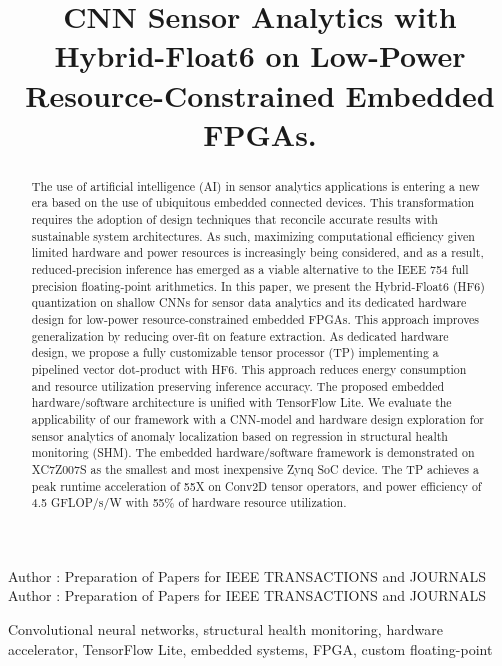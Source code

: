 \title {CNN Sensor Analytics with Hybrid-Float6 on Low-Power Resource-Constrained Embedded FPGAs.}



\markboth
{Author \headeretal: Preparation of Papers for IEEE TRANSACTIONS and JOURNALS}
{Author \headeretal: Preparation of Papers for IEEE TRANSACTIONS and JOURNALS}


\begin{abstract}
The use of artificial intelligence (AI) in sensor analytics applications is entering a new era based on the use of ubiquitous embedded connected devices. This transformation requires the adoption of design techniques that reconcile accurate results with sustainable system architectures. As such, maximizing computational efficiency given limited hardware and power resources is increasingly being considered, and as a result, reduced-precision inference has emerged as a viable alternative to the IEEE 754 full precision floating-point arithmetics. In this paper, we present the Hybrid-Float6 (HF6) quantization on shallow CNNs for sensor data analytics and its dedicated hardware design for low-power resource-constrained embedded FPGAs. This approach improves generalization by reducing over-fit on feature extraction. As dedicated hardware design, we propose a fully customizable tensor processor (TP) implementing a pipelined vector dot-product with HF6. This approach reduces energy consumption and resource utilization preserving inference accuracy. The proposed embedded hardware/software architecture is unified with TensorFlow Lite. We evaluate the applicability of our framework with a CNN-model and hardware design exploration for sensor analytics of anomaly localization based on regression in structural health monitoring (SHM). The embedded hardware/software framework is demonstrated on XC7Z007S as the smallest and most inexpensive Zynq SoC device. The TP achieves a peak runtime acceleration of 55X on Conv2D tensor operators, and power efficiency of 4.5 GFLOP/s/W with 55\% of hardware resource utilization.
\end{abstract}

\begin{keywords}
Convolutional neural networks, structural health monitoring, hardware accelerator, TensorFlow Lite, embedded systems, FPGA, custom floating-point
\end{keywords}

\titlepgskip=-15pt

\maketitle